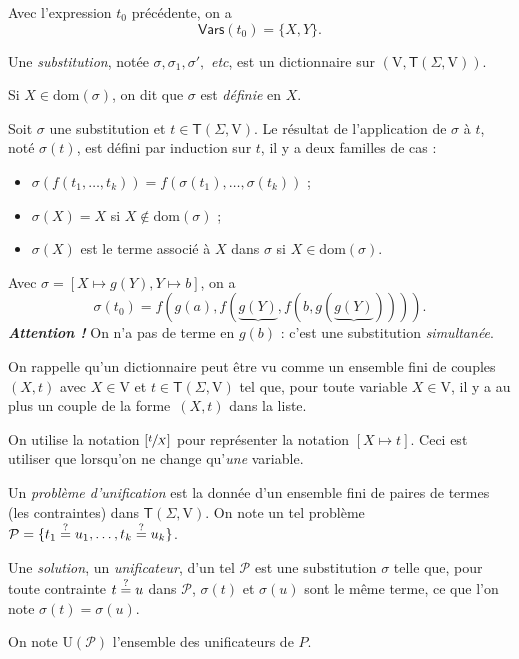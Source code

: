\documentclass[../main]{subfiles}
\begin{document}
  \begin{exm}
    Avec l'expression $t_0$ précédente, on a \[
      \mathsf{Vars}(t_0) = \{X,Y\}
    .\]
  \end{exm}

  \begin{defn}
    Une \textit{substitution}, notée $\sigma, \sigma_1, \sigma',$ \textit{etc}, est un dictionnaire sur $(\mathrm{V}, \mathsf{T}(\Sigma, \mathrm{V}))$.

    Si $X \in \mathrm{dom}(\sigma)$, on dit que $\sigma$ est \textit{définie} en $X$.

    Soit $\sigma$ une substitution et $t \in \mathsf{T}(\Sigma, \mathrm{V})$.
    Le résultat de l'application de $\sigma$ à $t$, noté $\sigma(t)$, est défini par induction sur $t$, il y a deux familles de cas :
    \begin{itemize}
      \item $\sigma(f(t_1, \ldots, t_k)) = f(\sigma(t_1), \ldots, \sigma(t_k))$ ;
      \item $\sigma(X) = X$ si  $X \not\in \mathrm{dom}(\sigma)$ ;
      \item $\sigma(X)$ est le terme associé à $X$ dans $\sigma$ si $X \in \mathrm{dom}(\sigma)$.
    \end{itemize}
  \end{defn}

  \begin{exm}
    Avec $\sigma = [X \mapsto g(Y), Y \mapsto b]$, on a \[
      \sigma(t_0) = f(g(a), f(\underbrace{g(Y)},f(b,g(\underbrace{g(Y)}))))
    .\] 
    \textit{\textbf{Attention !}} On n'a pas de terme en $g(b)$ : c'est une substitution \textit{simultanée}.
  \end{exm}

  \begin{note}
    On rappelle qu'un dictionnaire peut être vu comme un ensemble fini de couples $(X, t)$ avec  $X \in \mathrm{V}$ et $t \in \mathsf{T}(\Sigma, \mathrm{V})$ tel que, pour toute variable $X \in \mathrm{V}$, il y a au plus un couple de la forme~$(X,t)$ dans la liste.

    On utilise la notation $[\sfrac{t}{X}]$ pour représenter la notation $[X \mapsto t]$.
    Ceci est utiliser que lorsqu'on ne change qu'\textit{une} variable.
  \end{note}

  \begin{defn}
    Un \textit{problème d'unification} est la donnée d'un ensemble fini de paires de termes (les contraintes) dans $\mathsf{T}(\Sigma, \mathrm{V})$.
    On note un tel problème $\mathcal{P} = \{t_1 \mathrel{\overset ? =} u_1, \mathinner{\ldotp\ldotp\ldotp}, t_k \mathrel{\overset ? =} u_k \}$.

    Une \textit{solution}, un \textit{unificateur}, d'un tel $\mathcal{P}$ est une substitution $\sigma$ telle que, pour toute contrainte $t \mathrel{\overset ? =} u$ dans $\mathcal{P}$, $\sigma(t)$ et $\sigma(u)$  sont le même terme, ce que l'on note $\sigma(t) = \sigma(u)$.

    On note  $\mathrm{U}(\mathcal{P})$ l'ensemble des unificateurs de $P$.
  \end{defn}
\end{document}
